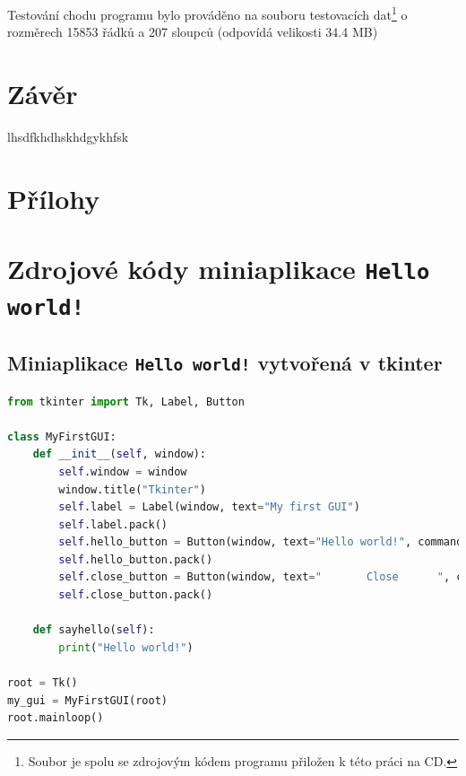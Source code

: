 \documentclass[a4paper, 12pt]{article}
\begin{document}
\vskip 0.5in
Testování chodu programu bylo prováděno na souboru testovacích dat\footnote{Soubor  je spolu se zdrojovým kódem programu přiložen k této práci na CD.} o rozměrech 15853 řádků a 207 sloupců (odpovídá velikosti 34.4 MB)


\clearpage
\newpage
\section{Závěr}
lhsdfkhdhskhdgykhfsk

\clearpage
\newpage


\newpage
\listoffigures

\newpage
\section*{Přílohy}
\appendix
\section{Zdrojové kódy miniaplikace \texttt{Hello world!}}
\label{PrilohaA}
\subsection{Miniaplikace \texttt{Hello world!} vytvořená v tkinter}
\begin{lstlisting}[language=Python]
from tkinter import Tk, Label, Button

class MyFirstGUI:
    def __init__(self, window):
        self.window = window
        window.title("Tkinter")
        self.label = Label(window, text="My first GUI")
        self.label.pack()
        self.hello_button = Button(window, text="Hello world!", command=self.sayhello)
        self.hello_button.pack()
        self.close_button = Button(window, text="       Close      ", command=window.quit)
        self.close_button.pack()

    def sayhello(self):
        print("Hello world!")

root = Tk()
my_gui = MyFirstGUI(root)
root.mainloop()
\end{lstlisting}
\newpage
\end{document}
